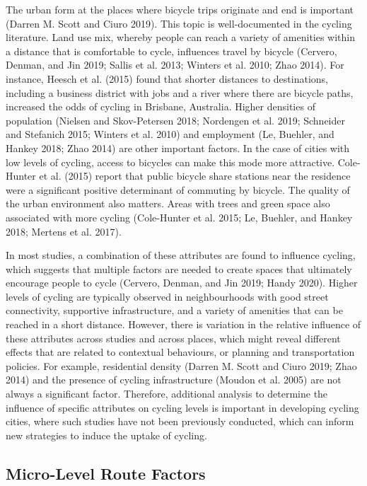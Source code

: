 \documentclass[smallextended]{svjour3}       %
\begin{document}
The urban form at the places where bicycle trips originate and end is
important (Darren M. Scott and Ciuro 2019). This topic is
well-documented in the cycling literature. Land use mix, whereby people
can reach a variety of amenities within a distance that is comfortable
to cycle, influences travel by bicycle (Cervero, Denman, and Jin 2019;
Sallis et al. 2013; Winters et al. 2010; Zhao 2014). For instance,
Heesch et al. (2015) found that shorter distances to destinations,
including a business district with jobs and a river where there are
bicycle paths, increased the odds of cycling in Brisbane, Australia.
Higher densities of population (Nielsen and Skov-Petersen 2018;
Nordengen et al. 2019; Schneider and Stefanich 2015; Winters et al.
2010) and employment (Le, Buehler, and Hankey 2018; Zhao 2014) are other
important factors. In the case of cities with low levels of cycling,
access to bicycles can make this mode more attractive. Cole-Hunter et
al. (2015) report that public bicycle share stations near the residence
were a significant positive determinant of commuting by bicycle. The
quality of the urban environment also matters. Areas with trees and
green space also associated with more cycling (Cole-Hunter et al. 2015;
Le, Buehler, and Hankey 2018; Mertens et al. 2017).

In most studies, a combination of these attributes are found to
influence cycling, which suggests that multiple factors are needed to
create spaces that ultimately encourage people to cycle (Cervero,
Denman, and Jin 2019; Handy 2020). Higher levels of cycling are
typically observed in neighbourhoods with good street connectivity,
supportive infrastructure, and a variety of amenities that can be
reached in a short distance. However, there is variation in the relative
influence of these attributes across studies and across places, which
might reveal different effects that are related to contextual
behaviours, or planning and transportation policies. For example,
residential density (Darren M. Scott and Ciuro 2019; Zhao 2014) and the
presence of cycling infrastructure (Moudon et al. 2005) are not always a
significant factor. Therefore, additional analysis to determine the
influence of specific attributes on cycling levels is important in
developing cycling cities, where such studies have not been previously
conducted, which can inform new strategies to induce the uptake of
cycling.

\hypertarget{route}{%
\subsection{Micro-Level Route Factors}\label{route}}
\end{document}
